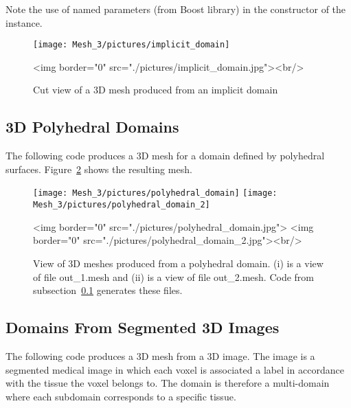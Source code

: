 Note the use of named parameters (from Boost library) in the
constructor of the  instance.


\begin{figure}[ht]
\begin{center}
 \begin{ccTexOnly}
   \texttt{[image: Mesh\_3/pictures/implicit\_domain]}
 \end{ccTexOnly}
 \begin{ccHtmlOnly}
   <img border="0" src="./pictures/implicit_domain.jpg"><br/>
 \end{ccHtmlOnly}
 \caption{Cut view of a 3D mesh produced from an implicit domain}
  \label{figure:implicit_domain}
\end{center}
\end{figure}


\subsection{3D Polyhedral Domains}
\label{Mesh_3_subsection_examples_polyhedral}
The following code produces a 3D mesh for a domain
defined by polyhedral surfaces. Figure~\ref{figure:polyhedral_domain}
shows the resulting mesh.


\begin{figure}[ht]
\begin{center}
 \begin{ccTexOnly}
   \texttt{[image: Mesh\_3/pictures/polyhedral\_domain]}
   \texttt{[image: Mesh\_3/pictures/polyhedral\_domain\_2]}
 \end{ccTexOnly}
 \begin{ccHtmlOnly}
   <img border="0" src="./pictures/polyhedral_domain.jpg">
   <img border="0" src="./pictures/polyhedral_domain_2.jpg"><br/>
 \end{ccHtmlOnly}
 \caption{View of 3D meshes produced from a polyhedral domain. (i) 
   is a view of file out\_1.mesh and (ii) is a view of file
   out\_2.mesh. Code from
   subsection~\ref{Mesh_3_subsection_examples_polyhedral} generates
   these files.}
  \label{figure:polyhedral_domain}
\end{center}
\end{figure}


\subsection{Domains  From Segmented 3D Images}
\label{Mesh_3_subsection_examples_3d_image}
The following code produces  a 3D mesh from
a 3D image. The image is a segmented medical image  in which each 
voxel  is associated a label  in accordance with
the tissue  the voxel belongs to.
The domain is therefore a multi-domain
where each subdomain corresponds to a specific tissue.

